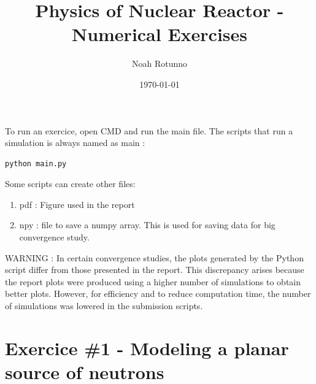 \documentclass[11pt,a4paper]{article}
\begin{document}
\title{Physics of Nuclear Reactor - Numerical Exercises}
\author{Noah Rotunno\\  %
}
\date{\today}
\maketitle


\newpage

To run an exercice, open CMD and run the main file. The scripts that run a simulation is always named as main : \\
\begin{lstlisting}
python main.py
\end{lstlisting}

Some scripts can create other files:
\begin{enumerate}
	\item pdf : Figure used in the report
	\item npy : file to save a numpy array. This is used for saving data for big convergence study.
\end{enumerate}

WARNING : In certain convergence studies, the plots generated by the Python script differ from those presented in the report. This discrepancy arises because the report plots were produced using a higher number of simulations to obtain better plots. However, for efficiency and to reduce computation time, the number of simulations was lowered in the submission scripts.

\section{Exercice \#1 - Modeling a planar source of neutrons}
\end{document}
